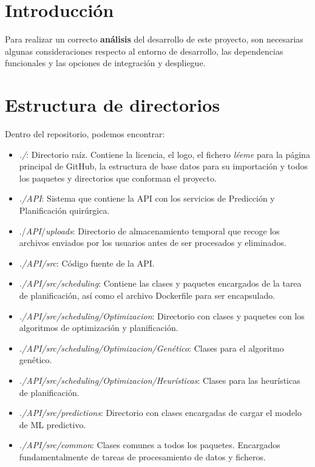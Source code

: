 
\section{Introducción}

Para realizar un correcto \textbf{análisis} del desarrollo de este proyecto, son necesarias algunas consideraciones respecto al entorno de desarrollo, las dependencias funcionales y las opciones de integración y despliegue.

\section{Estructura de directorios}

Dentro del repositorio, podemos encontrar:
\begin{itemize}
    \item \textit{./}: Directorio raíz. Contiene la licencia, el logo, el fichero \textit{léeme} para la página principal de GitHub, la estructura de base datos para su importación y todos los paquetes y directorios que conforman el proyecto.
    \item \textit{./API}:  Sistema que contiene la API con los servicios de Predicción y Planificación quirúrgica.
    \item ./\textit{API}/\textit{uploads}: Directorio de almacenamiento temporal que recoge los archivos enviados por los usuarios antes de ser procesados y eliminados.
    \item \textit{./API/src}: Código fuente de la API.
    \item \textit{./API/src/scheduling}: Contiene las clases y paquetes encargados de la tarea de planificación, así como el archivo Dockerfile para ser encapsulado.
    \item \textit{./API/src/scheduling/Optimizacion}: Directorio con clases y paquetes con los algoritmos de optimización y planificación.
    \item \textit{./API/src/scheduling/Optimizacion/Genético}: Clases para el algoritmo genético.
    \item \textit{./API/src/scheduling/Optimizacion/Heurísticas}: Clases para las heurísticas de planificación.
    \item \textit{./API/src/predictions}: Directorio con clases encargadas de cargar el modelo de ML predictivo.
    \item \textit{./API/src/common}: Clases comunes a todos los paquetes. Encargados fundamentalmente de tareas de procesamiento de datos y ficheros.

\end{itemize}

